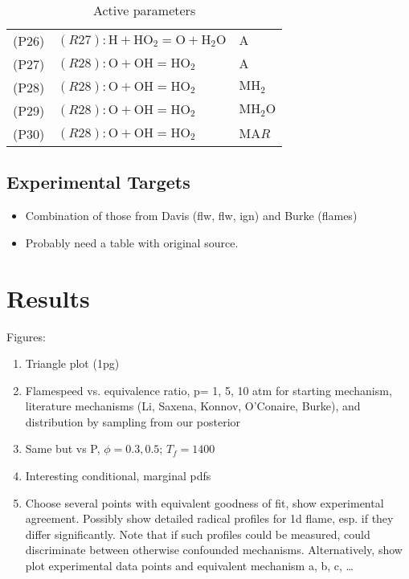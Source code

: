\documentclass[preprint,3p,times,twocolumn]{elsarticle}
\begin{document}
\begin{itemize}
\begin{table}[htp]
\begin{tabular}{l l l}
(P26)&$ (R27): \mathrm{H} + \mathrm{HO}_2 = \mathrm{O} + \mathrm{H}_2\mathrm{O}     $&$ \mathrm{A}$\\
(P27)&$ (R28): \mathrm{O} + \mathrm{OH} = \mathrm{HO}_2     $&$ \mathrm{A}$\\
(P28)&$ (R28): \mathrm{O} + \mathrm{OH} = \mathrm{HO}_2     $&$ \mathrm{M} \mathrm{H}_2$\\
(P29)&$ (R28): \mathrm{O} + \mathrm{OH} = \mathrm{HO}_2     $&$ \mathrm{M} \mathrm{H}_2\mathrm{O}$\\
(P30)&$ (R28): \mathrm{O} + \mathrm{OH} = \mathrm{HO}_2     $&$ \mathrm{M} \mathrm{A}R$\\
\hline
\end{tabular}
    \caption{Active parameters}
    \label{tab:parameters}
  \end{table}
\end{itemize}
\subsection{Experimental Targets}
\begin{itemize}
\item Combination of those from Davis (flw, flw, ign) and Burke
  (flames)
\item Probably need a table with original source.
\end{itemize}
\section{Results}
Figures:
\begin{enumerate}
\item Triangle plot (1pg)
\item Flamespeed vs. equivalence ratio, p= 1, 5, 10 atm for starting
  mechanism, literature mechanisms (Li, Saxena, Konnov, O'Conaire,
  Burke), and distribution by sampling from our posterior
\item Same but vs P, $\phi=0.3,0.5$; $T_f=1400$
    \item Interesting conditional, marginal pdfs
    \item Choose several points with equivalent goodness of fit, show
      experimental agreement. Possibly show detailed radical profiles
      for 1d flame, esp. if they differ significantly. Note that if
      such profiles could be measured, could discriminate between
      otherwise confounded mechanisms. Alternatively, show plot
      experimental data points and equivalent mechanism a, b, c,
      \ldots
 \end{enumerate}
 
\end{document}

